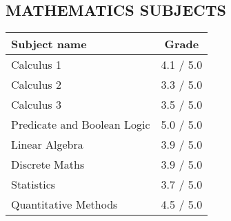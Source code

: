 \documentclass[margin, 10pt]{res} %
\begin{document}
\begin{resume}

\section{MATHEMATICS SUBJECTS}

\begin{center}
\begin{tabular}{| l | c |}
  \hline
  \textbf{Subject name} & \textbf{Grade}\\ \hline
  Calculus 1 & 4.1 / 5.0\\ \hline
  Calculus 2 & 3.3 / 5.0\\ \hline
  Calculus 3 & 3.5 / 5.0\\ \hline
  Predicate and Boolean Logic & 5.0 / 5.0\\ \hline
  Linear Algebra & 3.9 / 5.0\\ \hline
  Discrete Maths & 3.9 / 5.0\\ \hline
  Statistics & 3.7 / 5.0\\ \hline
  Quantitative Methods & 4.5 / 5.0\\ \hline
\end{tabular}
\end{center}

\end{resume}
\end{document}
